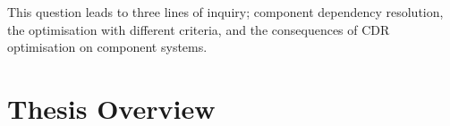 {}This question leads to three lines of inquiry; component dependency resolution, the optimisation with different criteria, and the consequences of CDR optimisation on component systems.




\section{Thesis Overview}
